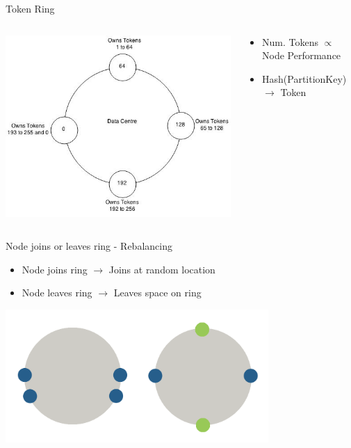 \documentclass[
  10pt
]{beamer}
\begin{document}
\begin{frame}{Token Ring \cite{cassandra_architecture_akhil}}
  \begin{columns}
    \begin{column}{0.6\textwidth}
    \includegraphics[width=\columnwidth]{resources/token_ring.jpg}
    \end{column}
    \begin{column}{0.4\textwidth}
      \begin{itemize}
        \item Num. Tokens $\propto$ Node Performance
        \item Hash(PartitionKey) \\ $\rightarrow$ Token
      \end{itemize}
    \end{column}
  \end{columns}
\end{frame}

\begin{frame}{Node joins or leaves ring - Rebalancing \cite{datastax_balancing}}
  \begin{itemize}
    \item Node joins ring $\rightarrow$ Joins at random location
    \item Node leaves ring $\rightarrow$ Leaves space on ring
  \end{itemize}
  \begin{center}
    \includegraphics[width=0.75\textwidth]{resources/rebalancing.png}
  \end{center}
\end{frame}
\end{document}
